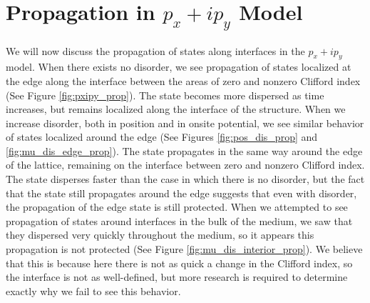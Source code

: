 \documentclass[a4paper]{article}
\begin{document}
\section{Propagation in \texorpdfstring{$p_x + ip_y$}{px + ipy} Model}

We will now discuss the propagation of states along interfaces in the $p_x + ip_y$ model.
When there exists no disorder, we see propagation of states localized at the edge along the interface between the areas of zero and nonzero Clifford index (See Figure \ref{fig:pxipy_prop}).
The state becomes more dispersed as time increases, but remains localized along the interface of the structure. 
When we increase disorder, both in position and in onsite potential, we see similar behavior of states localized around the edge (See Figures \ref{fig:pos_dis_prop} and \ref{fig:mu_dis_edge_prop}).
The state propagates in the same way around the edge of the lattice, remaining on the interface between zero and nonzero Clifford index.
The state disperses faster than the case in which there is no disorder, but the fact that the state still propagates around the edge suggests that even with disorder, the propagation of the edge state is still protected.
When we attempted to see propagation of states around interfaces in the bulk of the medium, we saw that they dispersed very quickly throughout the medium, so it appears this propagation is not protected (See Figure \ref{fig:mu_dis_interior_prop}).
We believe that this is because here there is not as quick a change in the Clifford index, so the interface is not as well-defined, but more research is required to determine exactly why we fail to see this behavior.
\end{document}
